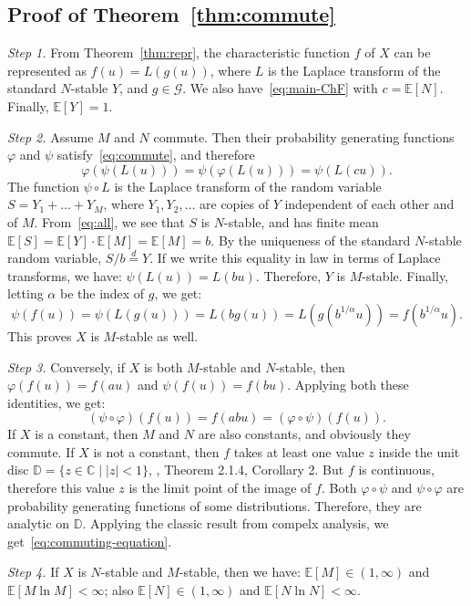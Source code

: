 \documentclass[12pt]{amsart}
\theoremstyle{remark}
\theoremstyle{definition}
\begin{document}
\subsection{Proof of Theorem~\ref{thm:commute}} 

{\it Step 1.} From Theorem~\ref{thm:repr}, the characteristic function $f$ of $X$ can be represented as $f(u) = L(g(u))$, where $L$ is the Laplace transform of the standard $N$-stable $Y$, and $g \in \mathcal G$. We also have~\eqref{eq:main-ChF} with $c = \mathbb E[N]$. Finally, $\mathbb E[Y] = 1$. 

{\it Step 2.} Assume $M$ and $N$ commute. Then their probability generating functions $\varphi$ and $\psi$ satisfy~\eqref{eq:commute}, and therefore
\begin{equation}
\label{eq:all}
\varphi(\psi(L(u))) = \psi(\varphi(L(u))) = \psi(L(cu)).
\end{equation}
The function $\psi\circ L$ is the Laplace transform of the random variable $S = Y_1 + \ldots + Y_M$, where $Y_1, Y_2,\ldots$ are copies of $Y$ independent of each other and of $M$. From~\eqref{eq:all}, we see that $S$ is $N$-stable, and has finite mean $\mathbb E[S] = \mathbb E[Y]\cdot \mathbb E[M] = \mathbb E[M] = b$. By the uniqueness of the standard $N$-stable random variable, $S/b \stackrel{d}{=} Y$. If we write this equality in law in terms of Laplace transforms, we have: $\psi(L(u)) = L(bu)$. Therefore, $Y$ is $M$-stable. Finally, letting $\alpha$ be the index of $g$, we get: 
$$
\psi(f(u)) = \psi(L(g(u))) = L(bg(u)) = L(g(b^{1/\alpha}u)) = f(b^{1/\alpha}u).
$$
This proves $X$ is $M$-stable as well. 

{\it Step 3.} Conversely, if $X$ is both $M$-stable and $N$-stable, then $\varphi(f(u)) = f(au)$ and $\psi(f(u)) = f(bu)$. Applying both these identities, we get: 
$$
(\psi\circ\varphi)(f(u)) = f(abu) = (\varphi\circ\psi)(f(u)).
$$
If $X$ is a constant, then $M$ and $N$ are also constants, and obviously they commute. If $X$ is not a constant, then $f$ takes at least one value $z$ inside the unit disc $\mathbb D = \{z \in \mathbb C\mid |z| < 1\}$, \cite[Chapter 2]{FTbook}, Theorem 2.1.4, Corollary 2. But $f$ is continuous, therefore this value $z$ is the limit point of the image of $f$. Both $\varphi\circ\psi$ and $\psi\circ\varphi$ are probability generating functions of some distributions. Therefore, they are analytic on $\mathbb D$. Applying the classic result from compelx analysis, we get~\eqref{eq:commuting-equation}. 

{\it Step 4.} If $X$ is $N$-stable and $M$-stable, then we have: $\mathbb E[M] \in (1, \infty)$ and $\mathbb E[M\ln M] < \infty$; also $\mathbb E[N] \in (1, \infty)$ and $\mathbb E[N\ln N] < \infty$.
\end{document}

